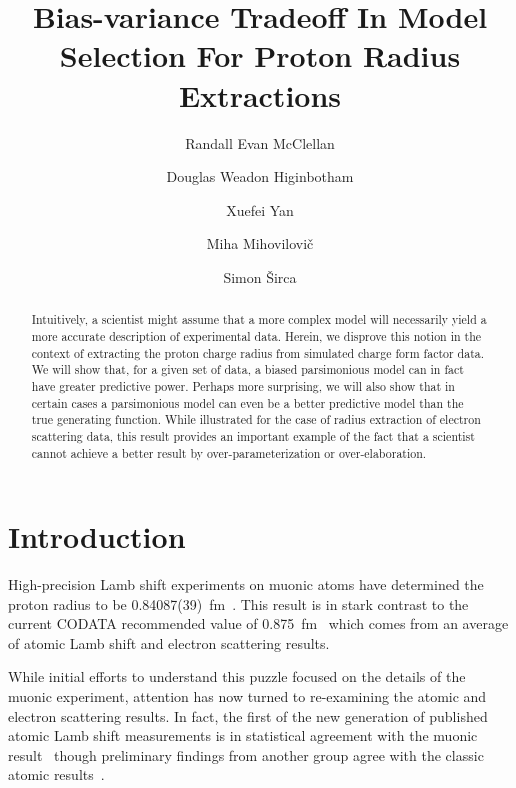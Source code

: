 \documentclass[10pt,aps,prc,twocolumn]{revtex4-1}
\begin{document}
\title{Bias-variance Tradeoff In Model Selection For Proton Radius Extractions}
%
%
\author{Randall Evan McClellan}
\author{Douglas Weadon Higinbotham}
\author{Xuefei Yan}
\author{Miha Mihovilovi\v{c}}
\author{Simon \v{S}irca}

\begin{abstract}
Intuitively, a scientist might assume that a more complex model will necessarily yield a more 
accurate description of experimental data.   Herein, we disprove this notion in the context of extracting 
the proton charge radius from simulated charge form factor data.  We will show that, for a given set of data, 
a biased parsimonious model can in fact have greater predictive power.  Perhaps more surprising,
we will also show that in certain cases a parsimonious model can even be a better predictive model 
than the true generating function.   While illustrated for the case of radius extraction of electron scattering data,
this result provides an important example of the fact that a scientist cannot achieve a better result by
over-parameterization or over-elaboration.
\end{abstract}

\maketitle

\section{Introduction}

High-precision Lamb shift experiments on muonic atoms have determined the proton radius to 
be 0.84087(39)~fm~\cite{Pohl:2010zza,Antognini:1900ns}.   This result is in stark contrast to the current
CODATA recommended value of 0.875~fm~\cite{Mohr:2015ccw} which comes from an average of atomic 
Lamb shift and electron scattering results.  

While initial efforts to understand this puzzle focused on the details of the muonic experiment, attention has
now turned to re-examining the atomic and electron scattering results.   In fact, the first of the
new generation of published atomic Lamb shift measurements is in statistical agreement with the muonic 
result~\cite{Beyer79} though preliminary findings from another group agree with the classic atomic 
results~\cite{fleurbaey:tel-01633631}.
\end{document}
